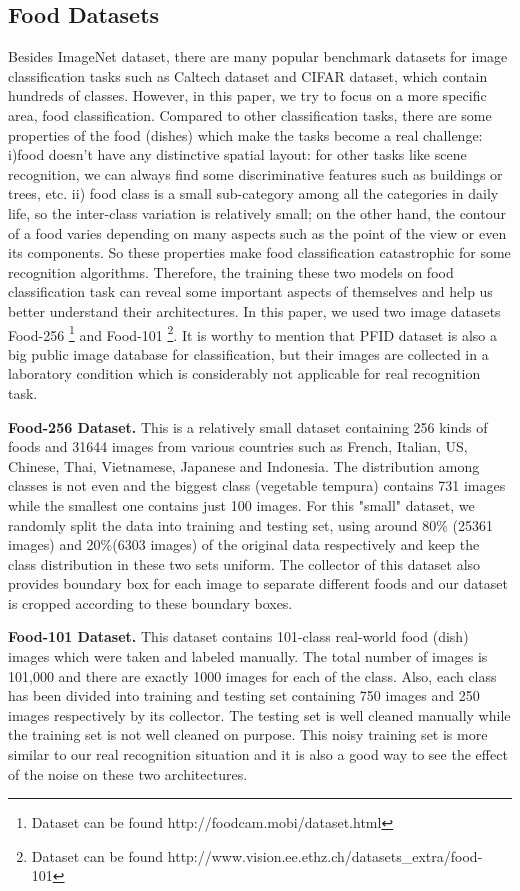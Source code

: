 \subsection{Food Datasets}
Besides ImageNet dataset, there are many popular benchmark datasets for image classification tasks such as Caltech dataset and CIFAR dataset, which contain hundreds of classes. However, in this paper, we try to focus on a more specific area, food classification. Compared to other classification tasks, there are some properties of the food (dishes) which make the tasks become a real challenge:
i)food doesn't have any distinctive spatial layout: for other tasks like scene recognition, we can always find some discriminative features such as buildings or trees, etc.
ii) food class is a small sub-category among all the categories in daily life, so the inter-class variation is relatively small; on the other hand, the contour of a food varies depending on many aspects such as the point of the view or even its components.
So these properties make food classification catastrophic for some recognition algorithms. Therefore, the training these two models on food classification task can reveal some important aspects of themselves and help us better understand their architectures. In this paper, we used two image datasets Food-256 \cite{kawano14c}\footnote{Dataset can be found http://foodcam.mobi/dataset.html} and Food-101 \cite{bossard14}\footnote{Dataset can be found http://www.vision.ee.ethz.ch/datasets\_extra/food-101}. It is worthy to mention that PFID dataset is also a big public image database for classification, but their images are collected in a laboratory condition which is considerably not applicable for real recognition task.

\textbf{Food-256 Dataset.}
This is a relatively small dataset containing 256 kinds of foods and 31644 images from various countries such as French, Italian, US, Chinese, Thai, Vietnamese, Japanese and Indonesia. The distribution among classes is not even and the biggest class (vegetable tempura) contains 731 images while the smallest one contains just 100 images. For this "small" dataset, we randomly split the data into training and testing set, using around 80\% (25361 images) and 20\%(6303 images) of the original data respectively and keep the class distribution in these two sets uniform. The collector of this dataset also provides boundary box for each image to separate different foods and our dataset is cropped according to these boundary boxes.

\textbf{Food-101 Dataset.}
This dataset contains 101-class real-world food (dish) images which were taken and labeled manually. The total number of images is 101,000 and there are exactly 1000 images for each of the class. Also, each class has been divided into training and testing set containing 750 images and 250 images respectively by its collector. The testing set is well cleaned manually while the training set is not well cleaned on purpose. This noisy training set is more similar to our real recognition situation and it is also a good way to see the effect of the noise on these two architectures.

